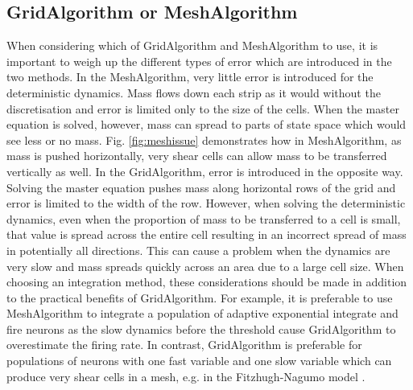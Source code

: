 \documentclass[utf8]{frontiersSCNS} %
\begin{document}
\subsection{GridAlgorithm or MeshAlgorithm} 
When considering which of GridAlgorithm and MeshAlgorithm to use, it is important to weigh up the different types of error which are introduced in the two methods. In the MeshAlgorithm, very little error is introduced for the deterministic dynamics. Mass flows down each strip as it would without the discretisation and error is limited only to the size of the cells. When the master equation is solved, however, mass can spread to parts of state space which would see less or no mass. Fig. \ref{fig:meshissue} demonstrates how in MeshAlgorithm, as mass is pushed horizontally, very shear cells can allow mass to be transferred vertically as well. In the GridAlgorithm, error is introduced in the opposite way. Solving the master equation pushes mass along horizontal rows of the grid and error is limited to the width of the row. However, when solving the deterministic dynamics, even when the proportion of mass to be transferred to a cell is small, that value is spread across the entire cell resulting in an incorrect spread of mass in potentially all directions. This can cause a problem when the dynamics are very slow and mass spreads quickly across an area due to a large cell size. When choosing an integration method, these considerations should be made in addition to the practical benefits of GridAlgorithm. For example, it is preferable to use MeshAlgorithm to integrate a population of adaptive exponential integrate and fire neurons as the slow dynamics before the threshold cause GridAlgorithm to overestimate the firing rate. In contrast, GridAlgorithm is preferable for populations of neurons with one fast variable and one slow variable which can produce very shear cells in a mesh, e.g. in the Fitzhugh-Nagumo model \citep{de2019computational}.\\
\end{document}
